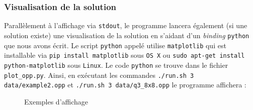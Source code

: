 \documentclass[a4paper]{article}
\begin{document}
\subsubsection{Visualisation de la solution}
Parallèlement à l'affichage via \texttt{stdout}, le programme lancera également (si une solution existe) une visualisation de la solution en s'aidant d'un \textit{binding} \texttt{python} que nous avons écrit. Le script \texttt{python} appelé utilise \texttt{matplotlib} qui est installable via \texttt{pip install matplotlib} sous \texttt{OS X} ou \texttt{sudo apt-get install python-matplotlib} sous \texttt{Linux}. Le code \texttt{python} se trouve dans le fichier \texttt{plot\_opp.py}. 
Ainsi, en exécutant les commandes \texttt{./run.sh 3 data/example2.opp} et \texttt{./run.sh 3 data/q3\_8x8.opp} le programme affichera : 

\begin{figure}[H]
  \centering
  \hfill
  \caption{Exemples d'affichage}
\end{figure}
\end{document}
